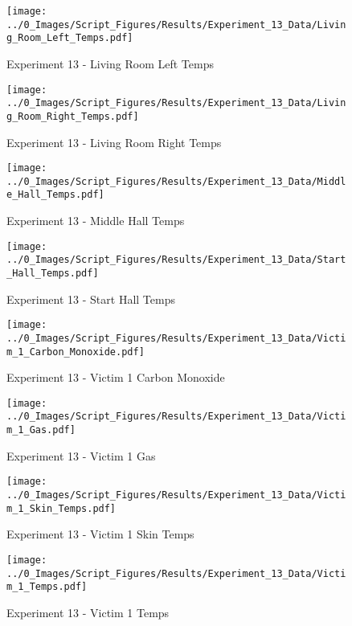 	\begin{figure}[H]
		\centering
		\texttt{[image: ../0\_Images/Script\_Figures/Results/Experiment\_13\_Data/Living\_Room\_Left\_Temps.pdf]}
		\caption[]{Experiment 13 - Living Room Left Temps}
	\end{figure}
 
	\clearpage

	\begin{figure}[H]
		\centering
		\texttt{[image: ../0\_Images/Script\_Figures/Results/Experiment\_13\_Data/Living\_Room\_Right\_Temps.pdf]}
		\caption[]{Experiment 13 - Living Room Right Temps}
	\end{figure}
 

	\begin{figure}[H]
		\centering
		\texttt{[image: ../0\_Images/Script\_Figures/Results/Experiment\_13\_Data/Middle\_Hall\_Temps.pdf]}
		\caption[]{Experiment 13 - Middle Hall Temps}
	\end{figure}
 
	\clearpage

	\begin{figure}[H]
		\centering
		\texttt{[image: ../0\_Images/Script\_Figures/Results/Experiment\_13\_Data/Start\_Hall\_Temps.pdf]}
		\caption[]{Experiment 13 - Start Hall Temps}
	\end{figure}
 

	\begin{figure}[H]
		\centering
		\texttt{[image: ../0\_Images/Script\_Figures/Results/Experiment\_13\_Data/Victim\_1\_Carbon\_Monoxide.pdf]}
		\caption[]{Experiment 13 - Victim 1 Carbon Monoxide}
	\end{figure}
 
	\clearpage

	\begin{figure}[H]
		\centering
		\texttt{[image: ../0\_Images/Script\_Figures/Results/Experiment\_13\_Data/Victim\_1\_Gas.pdf]}
		\caption[]{Experiment 13 - Victim 1 Gas}
	\end{figure}
 

	\begin{figure}[H]
		\centering
		\texttt{[image: ../0\_Images/Script\_Figures/Results/Experiment\_13\_Data/Victim\_1\_Skin\_Temps.pdf]}
		\caption[]{Experiment 13 - Victim 1 Skin Temps}
	\end{figure}
 
	\clearpage

	\begin{figure}[H]
		\centering
		\texttt{[image: ../0\_Images/Script\_Figures/Results/Experiment\_13\_Data/Victim\_1\_Temps.pdf]}
		\caption[]{Experiment 13 - Victim 1 Temps}
	\end{figure}
 

